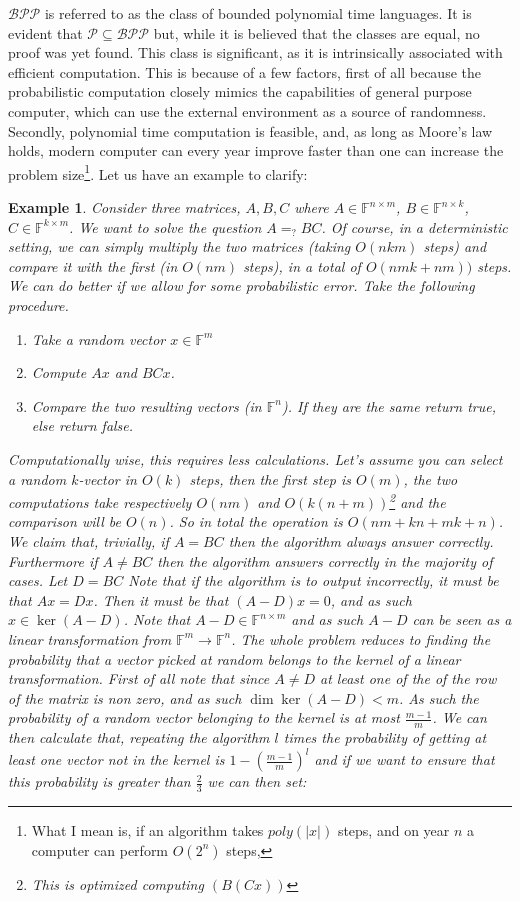 \documentclass{article}
\newtheorem{example}{Example}
\begin{document}
$\mathcal{BPP}$ is referred to as the class of bounded polynomial time languages. It is evident that $\mathcal{P} \subseteq \mathcal{BPP}$ but, while it is believed that the classes are equal, no proof was yet found. This class is significant, as it is intrinsically associated with efficient computation. This is because of a few factors, first of all because the probabilistic computation closely mimics the capabilities of general purpose computer, which can use the external environment as a source of randomness. Secondly, polynomial time computation is feasible, and, as long as Moore's law holds, modern computer can every year improve faster than one can increase the problem size\footnote{What I mean is, if an algorithm takes $poly(|x|)$ steps, and on year $n$ a computer can perform $O(2^n)$ steps, }. Let us have an example to clarify:
\begin{example}
Consider three matrices, $A, B, C$ where $A \in \mathbb{F}^{n \times m}$, $B \in \mathbb{F}^{n \times k}$, $C \in \mathbb{F}^{k \times m}$. We want to solve the question $A =_? B C$. Of course, in a deterministic setting, we can simply multiply the two matrices (taking $O(nkm)$ steps) and compare it with the first (in $O(nm)$ steps), in a total of $O(nmk + nm))$ steps. We can do better if we allow for some probabilistic error. Take the following procedure.
\begin{enumerate}
    \item Take a random vector $x \in \mathbb{F}^m$
    \item Compute $Ax$ and $BCx$.
    \item Compare the two resulting vectors (in $\mathbb{F}^n$). If they are the same return true, else return false. 
\end{enumerate}
Computationally wise, this requires less calculations. Let's assume you can select a random $k$-vector in $O(k)$ steps, then the first step is $O(m)$, the two computations take respectively $O(nm)$ and $O(k (n + m))$\footnote{This is optimized computing $(B(Cx))$} and the comparison will be $O(n)$. So in total the operation is $O(nm + kn + mk + n)$. We claim that, trivially, if $A = BC$ then the algorithm always answer correctly. Furthermore if $A \neq BC$ then the algorithm answers correctly in the majority of cases. Let $D = BC$ Note that if the algorithm is to output incorrectly, it must be that $Ax = Dx$. Then it must be that $(A - D) x = 0$, and as such $x \in \ker(A - D)$. Note that $A - D \in \mathbb{F}^{n \times m}$ and as such $A - D$ can be seen as a linear transformation from $\mathbb{F}^m \to \mathbb{F}^n$. The whole problem reduces to finding the probability that a vector picked at random belongs to the kernel of a linear transformation. First of all note that since $A \neq D$ at least one of the of the row of the matrix is non zero, and as such $\dim \ker (A - D) < m$. As such the probability of a random vector belonging to the kernel is at most $\frac{m-1}{m}$. We can then calculate that, repeating the algorithm $l$ times the probability of getting at least one vector not in the kernel is $1 - \left(\frac{m-1}{m}\right)^l$ and if we want to ensure that this probability is greater than $\frac{2}{3}$ we can then set:

\end{example}
\end{document}
